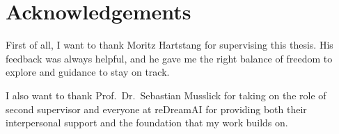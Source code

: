 \chapter*{Acknowledgements}

First of all, I want to thank Moritz Hartstang for supervising this
thesis. His feedback was always helpful, and he gave me the
right balance of freedom to explore and guidance to stay on track.

I also want to thank Prof.\ Dr.\ Sebastian Musslick for taking on the
role of second supervisor and everyone at reDreamAI for providing both their interpersonal support and the foundation that my work builds on.
